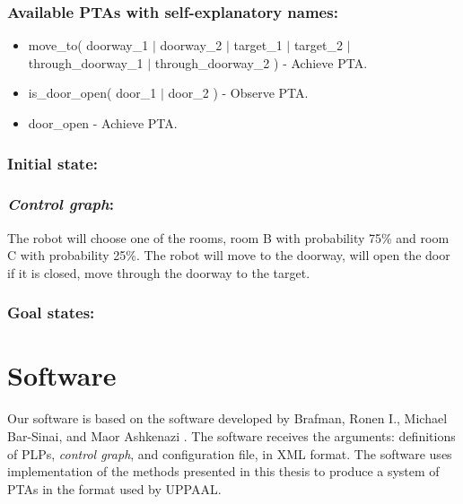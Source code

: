 \subsection{Available PTAs with self-explanatory names:}
\begin{itemize}
\item move_to( doorway_1 $\vert$ doorway_2 $\vert$ target_1 $\vert$ target_2 $\vert$ through_doorway_1 $\vert$ through_doorway_2 ) - Achieve PTA.
\item is_door_open( door_1 $\vert$ door_2 ) - Observe PTA.
\item door_open - Achieve PTA.
\end{itemize}
\subsection{Initial state: }
 \clearpage
\subsection{\textit{Control graph}:}
The robot will choose one of the rooms, room B with probability 75\% and room C with probability 25\%. The robot will move to the doorway, will open the door if it is closed, move through the doorway to the target.   \subsection{Goal states: }
 \clearpage
\chapter{Software }
Our software is based on the software developed by Brafman, Ronen I., Michael Bar-Sinai, and Maor Ashkenazi \cite{brafman2016performance}. The software receives the arguments: definitions of PLPs, \textit{control graph}, and configuration file, in XML format. The software uses implementation of the methods presented in this thesis to produce a system of PTAs in the format used by UPPAAL.\\
